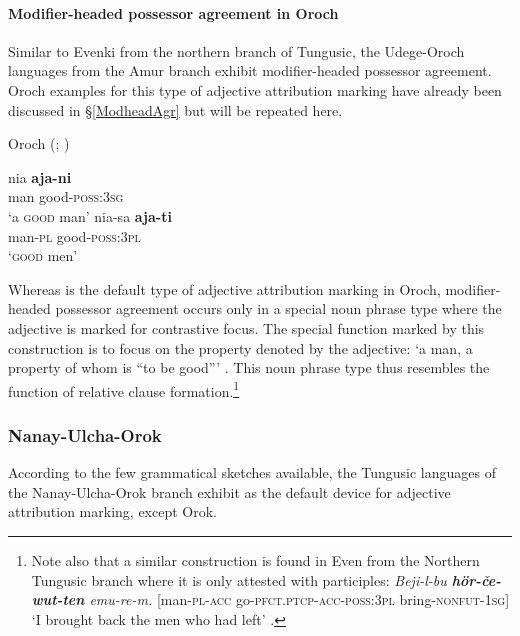 \paragraph*{Modifier\hyp{}headed possessor agreement in Oroch}
Similar to Evenki from the northern branch of Tungusic, the Udege-Oroch languages from the Amur branch exhibit modifier\hyp{}headed possessor agreement. Oroch examples for this type of adjective attribution marking have already been discussed in \S\ref{ModheadAgr} but will be repeated here.
\begin{exe}
\ex 
\label{oroch modhead}
\rm{Oroch (\citealt[207]{avrorin-etal1967}; \citealt[3]{malchukov2000})}
\begin{xlist}
\ex
\gll 	nia	\textbf{aja-ni}\\
	man good-\textsc{poss:3sg}\\
\glt	‘a \textsc{good} man’
\ex
\gll nia-sa \textbf{aja-ti}\\	
	man-\textsc{pl} good-\textsc{poss:3pl}\\
\glt	‘\textsc{good} men’
\end{xlist}
\end{exe}
Whereas  is the default type of adjective attribution marking in Oroch, modifier\hyp{}headed possessor agreement occurs only in a special noun phrase type where the adjective is marked for contrastive focus. The special function marked by this construction is to focus on the property denoted by the adjective: ‘a man, a property of whom is “to be good”’ \citep[3]{malchukov2000}. This noun phrase type thus resembles the function of relative clause formation.\footnote{Note also that a similar construction is found in Even from the Northern Tungusic branch where it is only attested with participles: \textit{Beji-l-bu \textbf{hör-če-wut-ten} emu-re-m.} [man-\textsc{pl}-\textsc{acc} go-\textsc{pfct.ptcp}-\textsc{acc}-\textsc{poss:3pl} bring-\textsc{nonfut}-\textsc{1sg}] ‘I brought back the men who had left’ \citep[31]{malchukov1995}.}

\subsubsection{Nanay-Ulcha-Orok}
According to the few grammatical sketches available, the Tungusic languages of the Nanay-Ulcha-Orok branch exhibit  as the default device for adjective attribution marking, except Orok.

